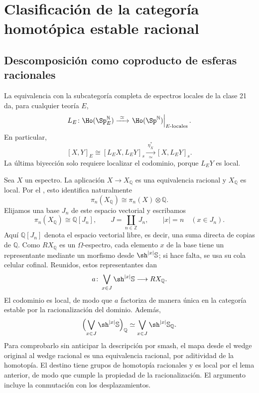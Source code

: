 \section{Clasificación de la categoría homotópica estable racional}

\subsection{Descomposición como coproducto de esferas racionales}
La equivalencia con la subcategoría completa de espectros locales de la clase 21 da, para cualquier teoría $E$,
\[
L_E\colon\Ho(\Sp_E^{\mathbb N})
\xrightarrow{\ \simeq\ }
\left.\Ho(\Sp^{\mathbb N})\right|_{E\text{-locales}}.
\]
En particular,
\[
[X,Y]_E\cong[L_EX,L_EY]_s
\xrightarrow[\simeq]{\ \eta_X^*\ }[X,L_EY]_s.
\]
La última biyección solo requiere localizar el codominio, porque $L_EY$ es local.

Sea $X$ un espectro. La aplicación $X\to X_{\mathbb Q}$ es una equivalencia racional y $X_{\mathbb Q}$ es local. Por el , esto identifica naturalmente
\[
\pi_n(X_{\mathbb Q})\cong\pi_n(X)\otimes\mathbb Q.
\]
Elijamos una base $J_n$ de este espacio vectorial y escribamos
\[
\pi_n(X_{\mathbb Q})\cong\mathbb Q[J_n],
\qquad J=\coprod_{n\in\mathbb Z}J_n,
\qquad |x|=n\quad(x\in J_n).
\]
Aquí $\mathbb Q[J_n]$ denota el espacio vectorial libre, es decir, una suma directa de copias de $\mathbb Q$. Como $RX_{\mathbb Q}$ es un $\Omega$-espectro, cada elemento $x$ de la base tiene un representante mediante un morfismo desde $\sh^{|x|}\mathbb S$; si hace falta, se usa su cola celular cofinal. Reunidos, estos representantes dan
\[
a\colon\bigvee_{x\in J}\sh^{|x|}\mathbb S
\longrightarrow RX_{\mathbb Q}.
\]
El codominio es local, de modo que $a$ factoriza de manera única en la categoría estable por la racionalización del dominio. Además,
\[
\Bigl(\bigvee_{x\in J}\sh^{|x|}\mathbb S\Bigr)_{\mathbb Q}
\simeq\bigvee_{x\in J}\sh^{|x|}\mathbb S_{\mathbb Q}.
\]
Para comprobarlo sin anticipar la descripción por smash, el mapa desde el wedge original al wedge racional es una equivalencia racional, por aditividad de la homotopía. El destino tiene grupos de homotopía racionales y es local por el lema anterior, de modo que cumple la propiedad de la racionalización. El argumento incluye la conmutación con los desplazamientos.

